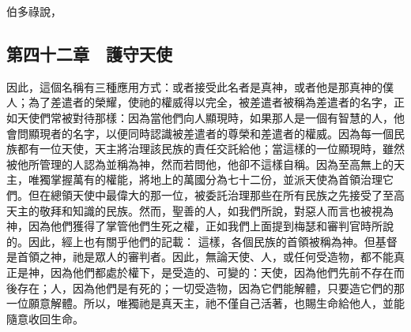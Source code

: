 伯多祿說，\par


\subsection{第四十二章　護守天使}

因此，這個名稱有三種應用方式：或者接受此名者是真神，或者他是那真神的僕人；為了差遣者的榮耀，使祂的權威得以完全，被差遣者被稱為差遣者的名字，正如天使們常被對待那樣：因為當他們向人顯現時，如果那人是一個有智慧的人，他會問顯現者的名字，以便同時認識被差遣者的尊榮和差遣者的權威。因為每一個民族都有一位天使，天主將治理該民族的責任交託給他；當這樣的一位顯現時，雖然被他所管理的人認為並稱為神，然而若問他，他卻不這樣自稱。因為至高無上的天主，唯獨掌握萬有的權能，將地上的萬國分為七十二份，並派天使為首領治理它們。但在總領天使中最偉大的那一位，被委託治理那些在所有民族之先接受了至高天主的敬拜和知識的民族。然而，聖善的人，如我們所說，對惡人而言也被視為神，因為他們獲得了掌管他們生死之權，正如我們上面提到梅瑟和審判官時所說的。因此，經上也有關乎他們的記載： 這樣，各個民族的首領被稱為神。但基督是首領之神，祂是眾人的審判者。因此，無論天使、人，或任何受造物，都不能真正是神，因為他們都處於權下，是受造的、可變的：天使，因為他們先前不存在而後存在；人，因為他們是有死的；一切受造物，因為它們能解體，只要造它們的那一位願意解體。所以，唯獨祂是真天主，祂不僅自己活著，也賜生命給他人，並能隨意收回生命。\par


